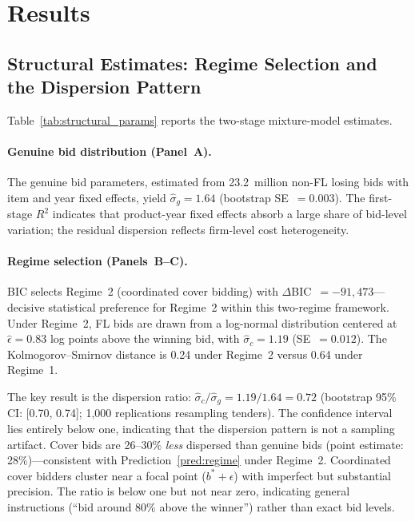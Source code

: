 
\section{Results}
\label{sec:results}


\subsection{Structural Estimates: Regime Selection and the Dispersion Pattern}
\label{sec:results_structural}

Table~\ref{tab:structural_params} reports the two-stage mixture-model
estimates.

\paragraph{Genuine bid distribution (Panel~A).}
The genuine bid parameters, estimated from 23.2~million non-FL losing
bids with item and year fixed effects, yield $\hat{\sigma}_g = 1.64$
(bootstrap SE~$= 0.003$). The first-stage $R^2$ indicates that
product-year fixed effects absorb a large share of bid-level
variation; the residual dispersion reflects firm-level cost
heterogeneity.

\paragraph{Regime selection (Panels~B--C).}
BIC selects Regime~2 (coordinated cover bidding) with
$\Delta$BIC~$= -91{,}473$---decisive statistical preference for
Regime~2 within this two-regime framework.
Under Regime~2, FL bids are drawn from a log-normal distribution
centered at $\hat{\epsilon} = 0.83$ log points above the winning bid,
with $\hat{\sigma}_c = 1.19$ (SE~$= 0.012$). The
Kolmogorov--Smirnov distance is 0.24 under Regime~2 versus 0.64
under Regime~1.

The key result is the dispersion ratio:
$\hat{\sigma}_c / \hat{\sigma}_g = 1.19 / 1.64 = 0.72$ (bootstrap
95\% CI: [0.70, 0.74]; 1,000 replications resampling tenders). The
confidence interval lies entirely below one, indicating that the
dispersion pattern is not a sampling artifact. Cover bids
are 26--30\% \emph{less} dispersed than genuine bids (point
estimate: 28\%)---consistent with
Prediction~\ref{pred:regime} under Regime~2. Coordinated cover
bidders cluster near a focal point ($b^* + \epsilon$) with imperfect
but substantial precision. The ratio is below one but not near zero,
indicating general instructions (``bid around 80\% above the
winner'') rather than exact bid levels.

